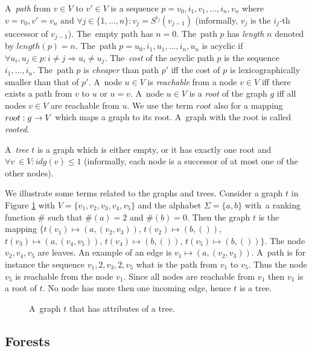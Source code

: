 A~\emph{path} from $v\in V$ to $v' \in V$ is a sequence $p=v_0, i_1, v_1, \ldots, i_n, v_n$ where $v=v_0, v' = v_n$
and $\forall j \in \{1,\ldots,n\}: v_j = S^{i_j}(v_{j-1})$ (informally, $v_j$ is the $i_j$-th successor of $v_{j-1}$).
The~empty path has $n=0$.
The~path $p$ has \emph{length} $n$ denoted by $length(p) = n$.
The~path $p=u_0,i_1,u_1,\ldots,i_n,u_n$ is acyclic if $\forall u_i,u_j \in p: i \neq j \Rightarrow u_i \neq u_j$.
The~\emph{cost} of the acyclic path $p$ is the sequence $i_1, \ldots, i_n$.
The~path $p$ is \emph{cheaper} than path $p'$ iff the cost of $p$ is lexicographically smaller than that of $p'$. 
A~node $u \in V$ is \emph{reachable} from a node $v \in V$ iff there exists a path from $v$ to $u$ or $u=v$.
A~node $u \in V$ is a \emph{root} of the graph $g$ iff all nodes $v \in V$ are reachable from $u$.
We use the term $root$ also for a mapping $root: g \rightarrow V$ which maps a graph to its root.
A~graph with the root is called \emph{rooted}.

A~\emph{tree} $t$ is a graph which is either empty, or it has exactly one root and $\forall v~\in V: idg(v) \leq 1$ (informally,
each node is a successor of at most one of the other nodes).

\bexmp
We illustrate some terms related to the graphs and trees.
Consider a graph $t$ in Figure \ref{fig:graph_tree}
with $V=\{v_1,v_2,v_3,v_4,v_5\}$ and
the alphabet $\Sigma = \{a,b\}$ with~a ranking function $\#$ such that $\#(a) = 2$ and $\#(b) = 0$.
Then the graph $t$ is the mapping $\{t(v_1) \mapsto (a, (v_2,v_3))$, $t(v_2) \mapsto (b, ())$,
$t(v_3) \mapsto (a, (v_4, v_5))$, $t(v_4) \mapsto (b, ())$, $t(v_5) \mapsto (b, ())\}$.
The node $v_2, v_4, v_5$ are leaves.
An example of an edge is $v_1 \mapsto (a,(v_2,v_3))$.
A~path is for instance the sequence $v_1, 2, v_3, 2, v_5$
what is the path from $v_1$ to $v_5$.
Thus the node $v_5$ is reachable from the node $v_1$.
Since all nodes are reachable from $v_1$ then $v_1$ is a root of $t$.
No node has more then one incoming edge, hence $t$ is a tree.

	\begin{figure}[bth]
		\begin{center}
			
		\end{center}
		\caption{A~graph $t$ that has attributes of a tree.}
		\label{fig:graph_tree}
	\end{figure}
	\label{ex:graph}
\eexmp

\subsection{Forests}
\label{subsec:forests}

